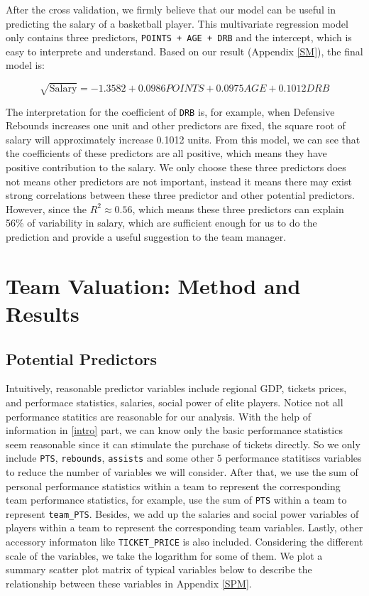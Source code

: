 \documentclass[12pt,]{article}
\begin{document}
After the cross validation, we firmly believe that our model can be
useful in predicting the salary of a basketball player. This
multivariate regression model only contains three predictors,
\texttt{POINTS\ +\ AGE\ +\ DRB} and the intercept, which is easy to
interprete and understand. Based on our result (Appendix \ref{SM}), the
final model is:

\begin{equation}
\sqrt{\text{Salary}} = -1.3582 + 0.0986POINTS + 0.0975AGE + 0.1012DRB
\end{equation}

The interpretation for the coefficient of \texttt{DRB} is, for example,
when Defensive Rebounds increases one unit and other predictors are
fixed, the square root of salary will approximately increase 0.1012
units. From this model, we can see that the coefficients of these
predictors are all positive, which means they have positive contribution
to the salary. We only choose these three predictors does not means
other predictors are not important, instead it means there may exist
strong correlations between these three predictor and other potential
predictors. However, since the \(R^2\approx 0.56\), which means these
three predictors can explain 56\% of variability in salary, which are
sufficient enough for us to do the prediction and provide a useful
suggestion to the team manager.

\section{Team Valuation: Method and Results}

\subsection{Potential Predictors}\label{PP2}

Intuitively, reasonable predictor variables include regional GDP,
tickets prices, and performace statistics, salaries, social power of
elite players. Notice not all performance statitics are reasonable for
our analysis. With the help of information in \ref{intro} part, we can
know only the basic performance statistics seem reasonable since it can
stimulate the purchase of tickets directly. So we only include
\texttt{PTS}, \texttt{rebounds}, \texttt{assists} and some other 5
performance statitiscs variables to reduce the number of variables we
will consider. After that, we use the sum of personal performance
statistics within a team to represent the corresponding team performance
statistics, for example, use the sum of \texttt{PTS} within a team to
represent \texttt{team\_PTS}. Besides, we add up the salaries and social
power variables of players within a team to represent the corresponding
team variables. Lastly, other accessory informaton like
\texttt{TICKET\_PRICE} is also included. Considering the different scale
of the variables, we take the logarithm for some of them. We plot a
summary scatter plot matrix of typical variables below to describe the
relationship between these variables in Appendix \ref{SPM}.
\end{document}
